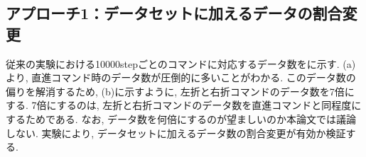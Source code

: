 \subsection{アプローチ1：データセットに加えるデータの割合変更}
従来の実験における10000stepごとのコマンドに対応するデータ数をに示す.  (a)より, 直進コマンド時のデータ数が圧倒的に多いことがわかる. このデータ数の偏りを解消するため,  (b)に示すように, 左折と右折コマンドのデータ数を7倍にする. 7倍にするのは, 左折と右折コマンドのデータ数を直進コマンドと同程度にするためである. なお, データ数を何倍にするのが望ましいのか本論文では議論しない. 実験により, データセットに加えるデータ数の割合変更が有効か検証する.




